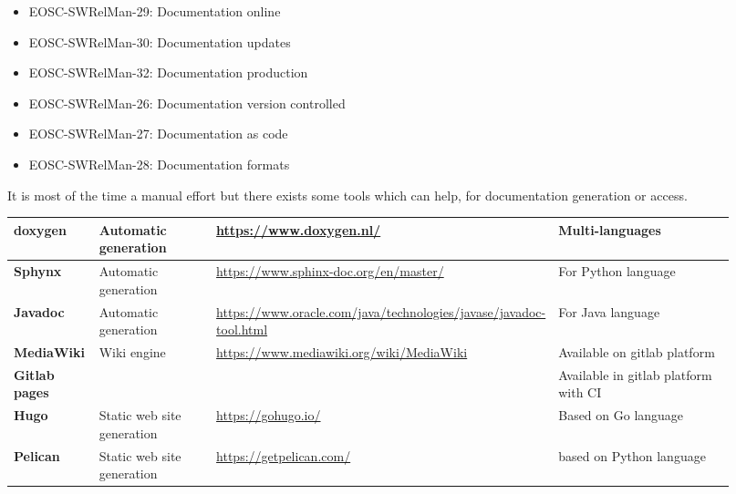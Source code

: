 \begin{itemize}
  \item EOSC-SWRelMan-29: Documentation online
  \item EOSC-SWRelMan-30: Documentation updates
  \item EOSC-SWRelMan-32: Documentation production
  \item EOSC-SWRelMan-26: Documentation version controlled
  \item EOSC-SWRelMan-27: Documentation as code
  \item EOSC-SWRelMan-28: Documentation formats
\end{itemize}

It is most of the time a manual effort but there exists some tools
which can help, for documentation generation or access.

\begin{center}
    \tabletail{\hline}
    \label{tab:tools_pack}
    \small
    \begin{supertabular}{|p{0.12\linewidth}|p{0.2\linewidth}|p{0.25\linewidth}|p{0.35\linewidth}|} \hline
    \textbf{doxygen} & Automatic generation & \url{https://www.doxygen.nl/}
    & Multi-languages \\ \hline
    \textbf{Sphynx} & Automatic generation & \url{https://www.sphinx-doc.org/en/master/}
    & For Python language \\ \hline
    \textbf{Javadoc} & Automatic generation & \url{https://www.oracle.com/java/technologies/javase/javadoc-tool.html}
    & For Java language  \\ \hline


    \textbf{MediaWiki} & Wiki engine & \url{https://www.mediawiki.org/wiki/MediaWiki}
    &  Available on gitlab platform \\ \hline
    \textbf{Gitlab pages} &  & \url{}
    & Available in gitlab platform with CI  \\ \hline
    \textbf{Hugo} & Static web site generation & \url{https://gohugo.io/}
    &   Based on Go language \\ \hline
    \textbf{Pelican} & Static web site generation & \url{https://getpelican.com/}
    &  based on Python language \\ \hline


\end{supertabular}
\end{center}

